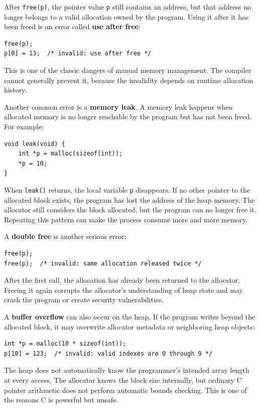 After \texttt{free(p)}, the pointer value \texttt{p} still contains an address, but that address no longer belongs to a valid allocation owned by the program. Using it after it has been freed is an error called \textbf{use after free}:

\begin{verbatim}
free(p);
p[0] = 13;  /* invalid: use after free */
\end{verbatim}

This is one of the classic dangers of manual memory management. The compiler cannot generally prevent it, because the invalidity depends on runtime allocation history.

Another common error is a \textbf{memory leak}. A memory leak happens when allocated memory is no longer reachable by the program but has not been freed. For example:

\begin{verbatim}
void leak(void) {
    int *p = malloc(sizeof(int));
    *p = 10;
}
\end{verbatim}

When \texttt{leak()} returns, the local variable \texttt{p} disappears. If no other pointer to the allocated block exists, the program has lost the address of the heap memory. The allocator still considers the block allocated, but the program can no longer free it. Repeating this pattern can make the process consume more and more memory.

A \textbf{double free} is another serious error:

\begin{verbatim}
free(p);
free(p);  /* invalid: same allocation released twice */
\end{verbatim}

After the first call, the allocation has already been returned to the allocator. Freeing it again corrupts the allocator's understanding of heap state and may crash the program or create security vulnerabilities.

A \textbf{buffer overflow} can also occur on the heap. If the program writes beyond the allocated block, it may overwrite allocator metadata or neighboring heap objects:

\begin{verbatim}
int *p = malloc(10 * sizeof(int));
p[10] = 123;  /* invalid: valid indexes are 0 through 9 */
\end{verbatim}

The heap does not automatically know the programmer's intended array length at every access. The allocator knows the block size internally, but ordinary C pointer arithmetic does not perform automatic bounds checking. This is one of the reasons C is powerful but unsafe.

